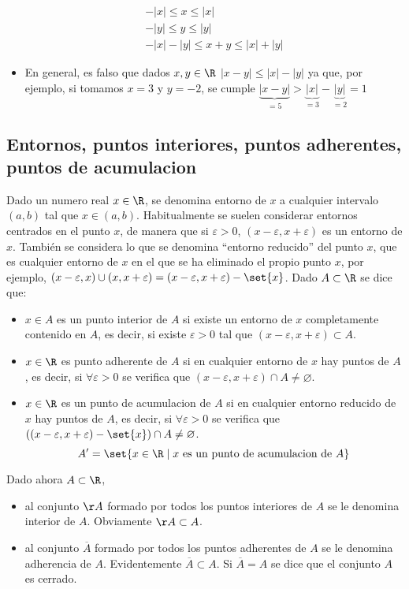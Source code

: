 \begin{itemize}
	      \[
		      \begin{array}{c}
			      - |x| \leq x \leq |x| \\
			      - |y| \leq y \leq |y| \\ \hline
			      -|x| - |y| \leq x + y \leq |x| + |y|
		      \end{array}
	      \]
	\item En general, es falso que dados \(x, y\in  \R \) \(|x - y| \leq |x| - |y| \) ya que, por ejemplo, si tomamos \(x = 3 \) y \(y = -2 \), se cumple \(\underbrace{|x-y|}_{= 5} > \underbrace{|x|}_{=3} - \underbrace{|y|}_{= 2} = 1\)
\end{itemize}
\subsection{Entornos, puntos interiores, puntos adherentes, puntos de acumulacion}
Dado un numero real \(x \in \R \), se denomina entorno de \(x \) a cualquier intervalo \((a,b )\) tal que \(x \in (a,b )\). Habitualmente se suelen considerar entornos centrados en el punto \(x \), de manera que si \(\varepsilon > 0 \), \((x - \varepsilon, x + \varepsilon)\) es un entorno de \(x\). También se considera lo que se denomina ``entorno reducido'' del punto \(x \), que es cualquier entorno de \(x \) en el que se ha eliminado el propio punto \(x \), por ejemplo, \((x - \varepsilon,x ) \cup (x, x + \varepsilon) = (x - \varepsilon, x + \varepsilon) - \set{x}\). Dado \(A \subset \R \) se dice que:
\begin{itemize}
	\item \(x \in A \) es un punto interior de \(A \) si  existe un entorno de \(x \) completamente contenido en \(A \), es decir, si existe \(\varepsilon > 0 \) tal que \((x - \varepsilon, x + \varepsilon) \subset A \).
	\item \(x \in \R \) es punto adherente de \(A \) si en cualquier entorno de \(x \) hay puntos de \(A \), es decir, si \(\forall \varepsilon > 0 \) se verifica que \((x - \varepsilon, x + \varepsilon) \cap A \neq \varnothing \).
	\item \(x \in \R \) es un punto de acumulacion de \(A \) si en cualquier entorno reducido de \(x \) hay puntos de \(A \), es decir, si \(\forall \varepsilon > 0 \) se verifica que \(((x - \varepsilon, x + \varepsilon) - \set{x}) \cap A \neq \varnothing \).
	      \[
		      A^\prime = \set{x \in \R \mid x \text{ es un punto de acumulacion de }A }
	      \]
\end{itemize}
Dado ahora \(A \subset \R \),
\begin{itemize}
	\item al conjunto \(\AA\) formado por todos los puntos interiores de \(A \) se le denomina interior de \(A \). Obviamente \(\AA \subset A \).
	\item al conjunto \(\overline{A} \) formado por todos los puntos adherentes de \(A \) se le denomina adherencia de \(A \). Evidentemente \(\overline{A} \subset A \). Si \(\overline{A} = A \) se dice que el conjunto \(A \) es cerrado.
\end{itemize}

